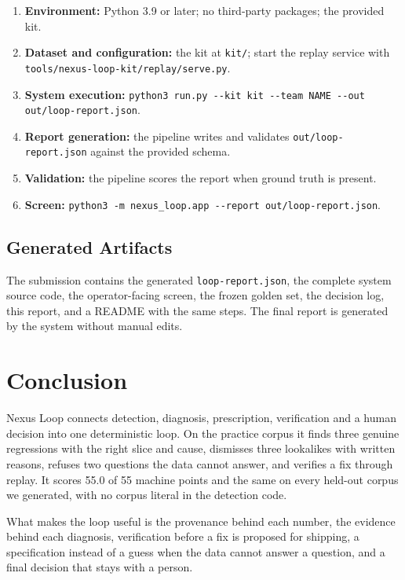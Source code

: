 \documentclass[8pt,twocolumn,a4paper]{extarticle}
\begin{document}
\begin{enumerate}
    \item \textbf{Environment:} Python 3.9 or later; no third-party
    packages; the provided kit.
    \item \textbf{Dataset and configuration:} the kit at
    \verb|kit/|; start the replay service with
    \verb|tools/nexus-loop-kit/replay/serve.py|.
    \item \textbf{System execution:}
    \verb|python3 run.py --kit kit --team NAME --out out/loop-report.json|.
    \item \textbf{Report generation:} the pipeline writes and validates
    \verb|out/loop-report.json| against the provided schema.
    \item \textbf{Validation:} the pipeline scores the report when
    ground truth is present.
    \item \textbf{Screen:}
    \verb|python3 -m nexus_loop.app --report out/loop-report.json|.
\end{enumerate}

\subsection{Generated Artifacts}

The submission contains the generated \texttt{loop-report.json}, the
complete system source code, the operator-facing screen, the frozen
golden set, the decision log, this report, and a README with the same
steps. The final report is generated by the system without manual edits.


\section*{Conclusion}

Nexus Loop connects detection, diagnosis, prescription, verification and
a human decision into one deterministic loop. On the practice corpus it
finds three genuine regressions with the right slice and cause, dismisses
three lookalikes with written reasons, refuses two questions the data
cannot answer, and verifies a fix through replay. It scores 55.0 of 55
machine points and the same on every held-out corpus we generated, with
no corpus literal in the detection code.

What makes the loop useful is the provenance behind each number, the
evidence behind each diagnosis, verification before a fix is proposed for
shipping, a specification instead of a guess when the data cannot answer
a question, and a final decision that stays with a person.
\end{document}

